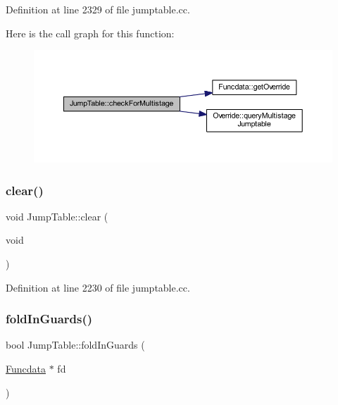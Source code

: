 Definition at line 2329 of file jumptable.\+cc.

Here is the call graph for this function\+:
\nopagebreak
\begin{figure}[H]
\begin{center}
\leavevmode
\includegraphics[width=350pt]{class_jump_table_a738bcb6e673e65e1d054d102da1cbdc5_cgraph}
\end{center}
\end{figure}
\mbox{\label{class_jump_table_a99d3224b0c24b9ef1140f86fe372879d}} 
\subsubsection{\texorpdfstring{clear()}{clear()}}
{\footnotesize\ttfamily void Jump\+Table\+::clear (\begin{DoxyParamCaption}\item[{void}]{ }\end{DoxyParamCaption})}



Definition at line 2230 of file jumptable.\+cc.

\mbox{\label{class_jump_table_a93527eafa438cf24fb5ee796e7bb1ba6}} 
\subsubsection{\texorpdfstring{foldInGuards()}{foldInGuards()}}
{\footnotesize\ttfamily bool Jump\+Table\+::fold\+In\+Guards (\begin{DoxyParamCaption}\item[{\mbox{\hyperlink{class_funcdata}{Funcdata}} $\ast$}]{fd }\end{DoxyParamCaption})\hspace{0.3cm}{\ttfamily [inline]}}



